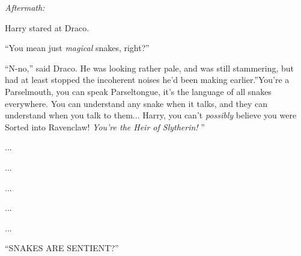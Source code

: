 \emph{Aftermath:}

Harry stared at Draco.

``You mean just \emph{magical} snakes, right?''

``N-no,'' said Draco. He was looking rather pale, and was still
stammering, but had at least stopped the incoherent noises he'd been
making earlier.''You're a Parselmouth, you can speak Parseltongue, it's
the language of all snakes everywhere. You can understand any snake when
it talks, and they can understand when you talk to them... Harry,
you can't \emph{possibly} believe you were Sorted into Ravenclaw!
\emph{You're the Heir of Slytherin!} ''

...

...

...

...

...

``SNAKES ARE SENTIENT?''

